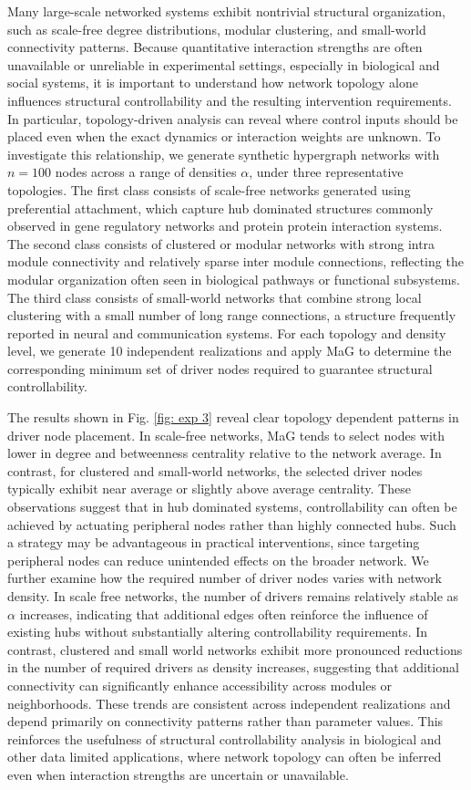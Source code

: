 \documentclass[journal,twoside,web]{ieeecolor}
\begin{document}
Many large-scale networked systems exhibit nontrivial structural organization, such as scale-free degree distributions, modular clustering, and small-world connectivity patterns. Because quantitative interaction strengths are often unavailable or unreliable in experimental settings, especially in biological and social systems, it is important to understand how network topology alone influences structural controllability and the resulting intervention requirements. In particular, topology-driven analysis can reveal where control inputs should be placed even when the exact dynamics or interaction weights are unknown. To investigate this relationship, we generate synthetic hypergraph networks with $n=100$ nodes across a range of densities $\alpha$, under three representative topologies. The first class consists of scale-free networks generated using preferential attachment, which capture hub dominated structures commonly observed in gene regulatory networks and protein protein interaction systems. The second class consists of clustered or modular networks with strong intra module connectivity and relatively sparse inter module connections, reflecting the modular organization often seen in biological pathways or functional subsystems. The third class consists of small-world networks that combine strong local clustering with a small number of long range connections, a structure frequently reported in neural and communication systems. For each topology and density level, we generate 10 independent realizations and apply MaG to determine the corresponding minimum set of driver nodes required to guarantee structural controllability.

The results shown in Fig. \ref{fig: exp 3} reveal clear topology dependent patterns in driver node placement. In scale-free networks, MaG tends to select nodes with lower in degree and betweenness centrality relative to the network average. In contrast, for clustered and small-world networks, the selected driver nodes typically exhibit near average or slightly above average centrality. These observations suggest that in hub dominated systems, controllability can often be achieved by actuating peripheral nodes rather than highly connected hubs. Such a strategy may be advantageous in practical interventions, since targeting peripheral nodes can reduce unintended effects on the broader network. We further examine how the required number of driver nodes varies with network density. In scale free networks, the number of drivers remains relatively stable as $\alpha$ increases, indicating that additional edges often reinforce the influence of existing hubs without substantially altering controllability requirements. In contrast, clustered and small world networks exhibit more pronounced reductions in the number of required drivers as density increases, suggesting that additional connectivity can significantly enhance accessibility across modules or neighborhoods. These trends are consistent across independent realizations and depend primarily on connectivity patterns rather than parameter values. This reinforces the usefulness of structural controllability analysis in biological and other data limited applications, where network topology can often be inferred even when interaction strengths are uncertain or unavailable.
\end{document}
